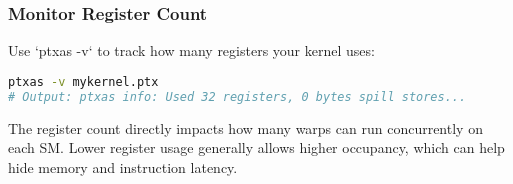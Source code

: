 \subsubsection{Monitor Register Count}

Use `ptxas -v` to track how many registers your kernel uses:

\begin{lstlisting}[language=bash]
ptxas -v mykernel.ptx
# Output: ptxas info: Used 32 registers, 0 bytes spill stores...
\end{lstlisting}

The register count directly impacts how many warps can run concurrently on each SM. Lower register usage generally allows higher occupancy, which can help hide memory and instruction latency.

